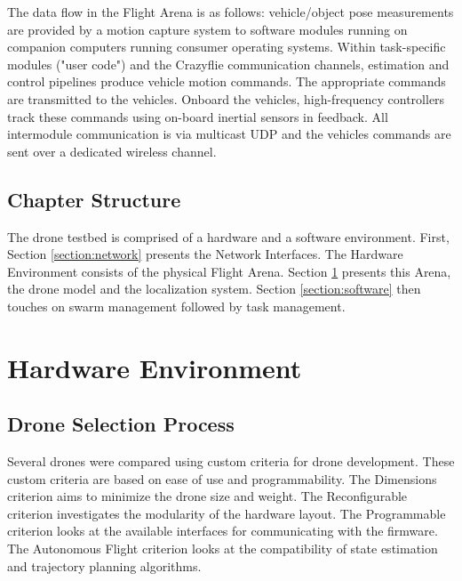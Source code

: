 The data flow in the Flight Arena is as follows: vehicle/object pose measurements are provided by a motion capture system to software modules running on companion computers running consumer operating systems. Within task-specific modules ("user code") and the Crazyflie communication channels, estimation and control pipelines produce vehicle motion commands. The appropriate commands are transmitted to the vehicles. Onboard the vehicles, high-frequency controllers track these commands using on-board inertial sensors in feedback. All intermodule communication is via multicast UDP and the vehicles commands are sent over a dedicated wireless channel.

\subsection{Chapter Structure}

The drone testbed is comprised of a hardware and a software environment. First, Section \ref{section:network} presents the Network Interfaces. The Hardware Environment consists of the physical Flight Arena. Section \ref{section:hardware} presents this Arena, the drone model and the localization system. Section \ref{section:software} then touches on swarm management followed by task management.

\pagebreak
\section{Hardware Environment}\label{section:hardware}
\subsection{Drone Selection Process}

Several drones were compared using custom criteria for drone development. These custom criteria are based on ease of use and programmability. The Dimensions criterion aims to minimize the drone size and weight. The Reconfigurable criterion investigates the modularity of the hardware layout. The Programmable criterion looks at the available interfaces for communicating with the firmware. The Autonomous Flight criterion looks at the compatibility of state estimation and trajectory planning algorithms.

